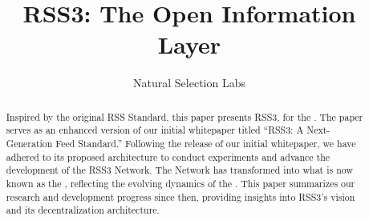 \documentclass[conference]{IEEEtran}
\begin{document}
\title{RSS3: The Open Information Layer}

\author{Natural Selection Labs}
\maketitle

\thispagestyle{plain}
\pagestyle{plain}

\begin{abstract}

    Inspired by the original RSS Standard, this paper presents RSS3,  for the . The paper serves as an enhanced version of our initial whitepaper titled ``RSS3: A Next-Generation Feed Standard.'' Following the release of our initial whitepaper, we have adhered to its proposed architecture to conduct experiments and advance the development of the RSS3 Network. The Network has transformed into what is now known as the , reflecting the evolving dynamics of the . This paper summarizes our research and development progress since then, providing insights into RSS3's vision and its decentralization architecture.

\end{abstract}












\printglossary[type=main,title=Glossary, toctitle=Glossary]





\end{document}
